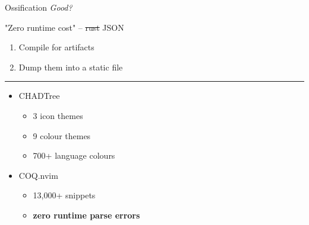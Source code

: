 \documentclass{beamer}
\begin{document}
\begin{frame}{Ossification \textit{Good?}}

	"Zero runtime cost" -- \st{rust} JSON

	\begin{enumerate}

		\item Compile  for artifacts

		\item Dump them into a static file

	\end{enumerate}

	\rule{\textwidth}{0.1em}

	\begin{itemize}

		\item CHADTree

		      \begin{itemize}

			      \item 3 icon themes

			      \item 9 colour themes

			      \item 700+ language colours

		      \end{itemize}

		\item COQ.nvim

		      \begin{itemize}

			      \item 13,000+ snippets

			      \item \textbf{zero runtime parse errors}

		      \end{itemize}

	\end{itemize}

\end{frame}
\end{document}
